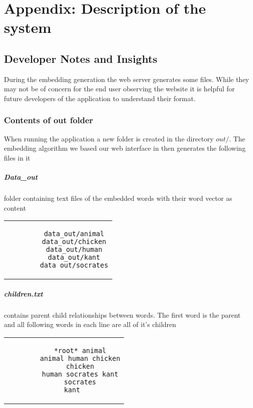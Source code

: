 \chapter{Appendix: Description of the system}
\label{dev_notes}
\section{Developer Notes and Insights}
During the embedding generation the web server generates some files. While they may not be of concern for the end user observing the website it is helpful for future developers of the application to understand their format.

\subsection{Contents of out folder}
When running the application a new folder is created in the directory $out/$. The embedding algorithm we based our web interface in then generates the following files in it
\paragraph{Data\_out} folder containing text files of the embedded words with their word vector as content
\begin{center}
	
	\begin{tabular}{c}
		\begin{lstlisting}
		data_out/animal
		data_out/chicken
		data_out/human
		data_out/kant
		data_out/socrates
		\end{lstlisting}
	\end{tabular}
\end{center}

\paragraph{children.txt} contains parent child relationships between words. The first word is the parent and all following words in each line are all of it's children
\begin{center}
	\begin{tabular}{c}
		\begin{lstlisting}
		*root* animal
		animal human chicken
		chicken
		human socrates kant
		socrates
		kant	
		\end{lstlisting}
	\end{tabular}
\end{center}

